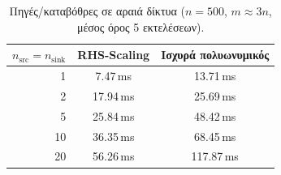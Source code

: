 \begin{table}[h]
\centering
\caption{Πηγές/καταβόθρες σε αραιά δίκτυα ($n = 500$, $m \approx 3n$, μέσος όρος 5 εκτελέσεων).}
\label{tab:sources-sparse}
\begin{tabular}{rcc}
\toprule
$n_{\text{src}} = n_{\text{sink}}$ & \textenglish{RHS-Scaling} & Ισχυρά πολυωνυμικός \\
\midrule
  1 & 7.47\,ms & 13.71\,ms \\
  2 & 17.94\,ms & 25.69\,ms \\
  5 & 25.84\,ms & 48.42\,ms \\
  10 & 36.35\,ms & 68.45\,ms \\
  20 & 56.26\,ms & 117.87\,ms \\
\bottomrule
\end{tabular}
\end{table}
